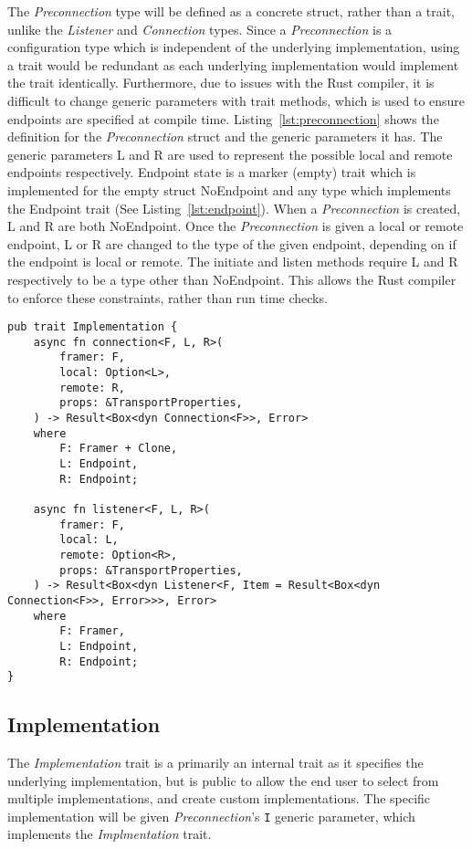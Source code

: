 The \emph{Preconnection} type will be defined as a concrete struct, rather than a trait, unlike the \emph{Listener} and
\emph{Connection} types.
Since a \emph{Preconnection} is a configuration type which is independent of the underlying implementation, using a
trait would be redundant as each underlying implementation would implement the trait identically.
Furthermore, due to issues with the Rust compiler, it is difficult to change generic parameters with trait methods,
which is used to ensure endpoints are specified at compile time.
Listing~\ref{lst:preconnection} shows the definition for the \emph{Preconnection} struct and the generic parameters it
has.
The generic parameters L and R are used to represent the possible local and remote endpoints respectively.
Endpoint state is a marker (empty) trait which is implemented for the empty struct NoEndpoint and any type which
implements the Endpoint trait (See Listing~\ref{lst:endpoint}).
When a \emph{Preconnection} is created, L and R are both NoEndpoint.
Once the \emph{Preconnection} is given a local or remote endpoint, L or R are changed to the type of the given endpoint,
depending on if the endpoint is local or remote.
The initiate and listen methods require L and R respectively to be a type other than NoEndpoint.
This allows the Rust compiler to enforce these constraints, rather than run time checks.

\begin{lstlisting}[float=h, label=lst:impl, caption={The Implementation trait.}]
pub trait Implementation {
    async fn connection<F, L, R>(
        framer: F,
        local: Option<L>,
        remote: R,
        props: &TransportProperties,
    ) -> Result<Box<dyn Connection<F>>, Error>
    where
        F: Framer + Clone,
        L: Endpoint,
        R: Endpoint;

    async fn listener<F, L, R>(
        framer: F,
        local: L,
        remote: Option<R>,
        props: &TransportProperties,
    ) -> Result<Box<dyn Listener<F, Item = Result<Box<dyn Connection<F>>, Error>>>, Error>
    where
        F: Framer,
        L: Endpoint,
        R: Endpoint;
}
\end{lstlisting}

\subsection{Implementation}\label{subsec:implementation}
The \emph{Implementation} trait is a primarily an internal trait as it specifies the underlying implementation, but is
public to allow the end user to select from multiple implementations, and create custom implementations.
The specific implementation will be given \emph{Preconnection}'s \texttt{I} generic parameter, which implements the
\emph{Implmentation} trait.

